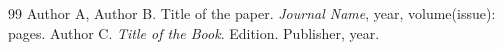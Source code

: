 \begin{thebibliography}{99}
   Author A, Author B. Title of the paper. \emph{Journal Name}, year, volume(issue): pages.
   Author C. \emph{Title of the Book}. Edition. Publisher, year.
\end{thebibliography}
